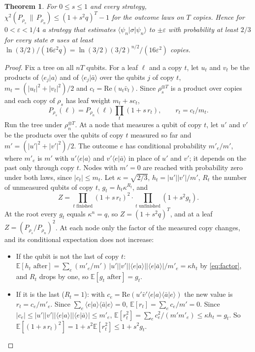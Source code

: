 \documentclass[11pt]{article}
\newtheorem{theorem}{Theorem}
\theoremstyle{remark}
\newcommand{\eps}{\varepsilon}
\newcommand{\ket}[1]{|#1\rangle}
\newcommand{\bra}[1]{\langle #1|}
\newcommand{\abar}{\bar a}
\newcommand{\E}{\mathbb{E}}
\begin{document}
\begin{theorem}\label{thm:half}
For $0\le s\le1$ and every strategy, $\chi^2(P_{\rho_s}\,\|\,P_{\rho_n})\le(1+s^2q)^T-1$ for the outcome laws on $T$ copies. Hence for $0<\eps<1/4$ a strategy that estimates $\bra{\psi_n}\sigma\ket{\psi_n}$ to $\pm\eps$ with probability at least $2/3$ for every state $\sigma$ uses at least $\ln(3/2)/(16\eps^2q) = \ln(3/2)(3/2)^{n/2}/(16\eps^2)$ copies.
\end{theorem}

\begin{proof}
Fix a tree on all $nT$ qubits. For a leaf $\ell$ and a copy $t$, let $u_t$ and $v_t$ be the products of $\langle e_j|a\rangle$ and of $\langle e_j|\abar\rangle$ over the qubits $j$ of copy $t$, $m_t = (|u_t|^2+|v_t|^2)/2$ and $c_t = \mathrm{Re}(u_t\bar v_t)$. Since $\rho_s^{\otimes T}$ is a product over copies and each copy of $\rho_s$ has leaf weight $m_t+sc_t$,
\[
P_{\rho_s}(\ell) = P_{\rho_n}(\ell)\prod_t(1+s\,r_t),\qquad r_t = c_t/m_t.
\]
Run the tree under $\rho_n^{\otimes T}$. At a node that measures a qubit of copy $t$, let $u'$ and $v'$ be the products over the qubits of copy $t$ measured so far and $m' = (|u'|^2+|v'|^2)/2$. The outcome $e$ has conditional probability $m'_e/m'$, where $m'_e$ is $m'$ with $u'\langle e|a\rangle$ and $v'\langle e|\abar\rangle$ in place of $u'$ and $v'$; it depends on the past only through copy $t$. Nodes with $m' = 0$ are reached with probability zero under both laws, since $|c_t|\le m_t$. Let $\kappa = \sqrt{2/3}$, $h_t = |u'||v'|/m'$, $R_t$ the number of unmeasured qubits of copy $t$, $g_t = h_t\kappa^{R_t}$, and
\[
Z = \prod_{t\text{ finished}}(1+s\,r_t)^2\cdot\prod_{t\text{ unfinished}}(1+s^2g_t).
\]
At the root every $g_t$ equals $\kappa^n = q$, so $Z = (1+s^2q)^T$, and at a leaf $Z = (P_{\rho_s}/P_{\rho_n})^2$. At each node only the factor of the measured copy changes, and its conditional expectation does not increase:
\begin{itemize}
\item If the qubit is not the last of copy $t$: $\E[h_t\text{ after}] = \sum_e(m'_e/m')\,|u'||v'||\langle e|a\rangle||\langle e|\abar\rangle|/m'_e = \kappa h_t$ by \eqref{eq:factor}, and $R_t$ drops by one, so $\E[g_t\text{ after}] = g_t$.
\item If it is the last ($R_t = 1$): with $c_e = \mathrm{Re}(u'\bar v'\langle e|a\rangle\langle\abar|e\rangle)$ the new value is $r_t = c_e/m'_e$. Since $\sum_e\langle e|a\rangle\langle\abar|e\rangle = 0$, $\E[r_t] = \sum_ec_e/m' = 0$. Since $|c_e|\le|u'||v'||\langle e|a\rangle||\langle e|\abar\rangle|\le m'_e$, $\E[r_t^2] = \sum_ec_e^2/(m'm'_e)\le\kappa h_t = g_t$. So $\E[(1+s\,r_t)^2] = 1+s^2\E[r_t^2]\le1+s^2g_t$.

\end{itemize}
\end{proof}
\end{document}
